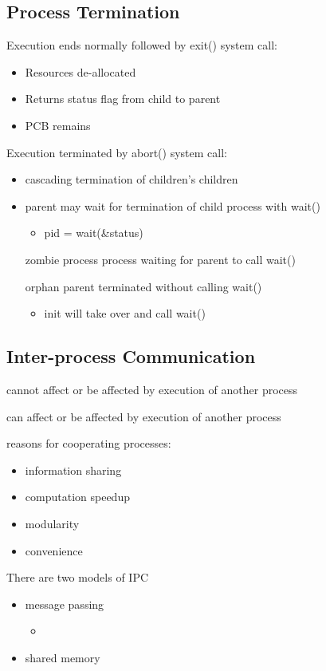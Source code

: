\documentclass[11pt]{article}
\begin{document}
\subsection{Process Termination}
\label{sec:org1512e8a}
Execution ends normally followed by exit() system call:
\begin{itemize}
\item Resources de-allocated
\item Returns status flag from child to parent
\item PCB remains
\end{itemize}
Execution terminated by abort() system call:
\begin{itemize}
\item cascading termination of children's children
\item parent may wait for termination of child process with wait()
\begin{itemize}
\item pid = wait(\&status)
\end{itemize}
\item[{zombie process}] process waiting for parent to call wait()
\item[{orphan}] parent terminated without calling wait()
\begin{itemize}
\item init will take over and call wait()
\end{itemize}
\end{itemize}
\subsection{Inter-process Communication}
\label{sec:orgd145718}
\begin{description}
\item[{Independent process}] cannot affect or be affected by execution of another process
\item[{Cooperating process}] can affect or be affected by execution of another process
\item reasons for cooperating processes:
\begin{itemize}
\item information sharing
\item computation speedup
\item modularity
\item convenience
\end{itemize}
\item There are two models of IPC 
\begin{itemize}
\item message passing
\begin{itemize}
\item 
\end{itemize}
\item shared memory
\end{itemize}
\end{description}
\end{document}
